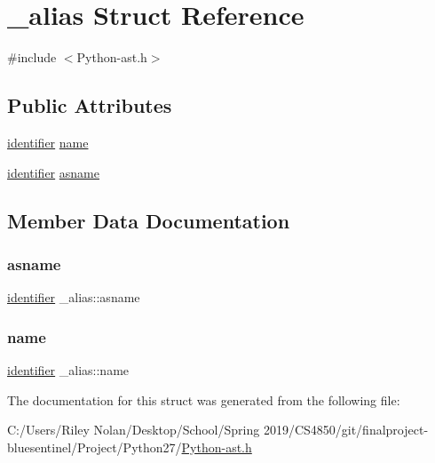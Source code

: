 \hypertarget{struct__alias}{}\section{\+\_\+alias Struct Reference}
\label{struct__alias}


{\ttfamily \#include $<$Python-\/ast.\+h$>$}

\subsection*{Public Attributes}
\begin{DoxyCompactItemize}
\item 
\mbox{\hyperlink{asdl_8h_a78ca2081e230a95abc88c411c9816775}{identifier}} \mbox{\hyperlink{struct__alias_af317c19681cf1e813594be225bedeb4f}{name}}
\item 
\mbox{\hyperlink{asdl_8h_a78ca2081e230a95abc88c411c9816775}{identifier}} \mbox{\hyperlink{struct__alias_af2fcbe1eeb356bd031f49869bdcd8a7e}{asname}}
\end{DoxyCompactItemize}


\subsection{Member Data Documentation}
\mbox{\label{struct__alias_af2fcbe1eeb356bd031f49869bdcd8a7e}} 
\subsubsection{\texorpdfstring{asname}{asname}}
{\footnotesize\ttfamily \mbox{\hyperlink{asdl_8h_a78ca2081e230a95abc88c411c9816775}{identifier}} \+\_\+alias\+::asname}

\mbox{\label{struct__alias_af317c19681cf1e813594be225bedeb4f}} 
\subsubsection{\texorpdfstring{name}{name}}
{\footnotesize\ttfamily \mbox{\hyperlink{asdl_8h_a78ca2081e230a95abc88c411c9816775}{identifier}} \+\_\+alias\+::name}



The documentation for this struct was generated from the following file\+:\begin{DoxyCompactItemize}
\item 
C\+:/\+Users/\+Riley Nolan/\+Desktop/\+School/\+Spring 2019/\+C\+S4850/git/finalproject-\/bluesentinel/\+Project/\+Python27/\mbox{\hyperlink{_python-ast_8h}{Python-\/ast.\+h}}\end{DoxyCompactItemize}
